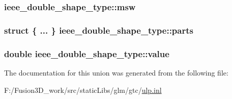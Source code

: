 \subsubsection[{msw}]{ ieee\+\_\+double\+\_\+shape\+\_\+type\+::msw}\label{unionieee__double__shape__type_aea1156759f6afd58a56a7b4e7bfcee01}
\hypertarget{unionieee__double__shape__type_a5f0f0bc8771b433d849b7faf0e48bac6}{}
\subsubsection[{parts}]{\setlength{\rightskip}{0pt plus 5cm}struct \{ ... \}   ieee\+\_\+double\+\_\+shape\+\_\+type\+::parts}\label{unionieee__double__shape__type_a5f0f0bc8771b433d849b7faf0e48bac6}
\hypertarget{unionieee__double__shape__type_a2d9c4cab9e3fa74e4be6d72f798a145b}{}
\subsubsection[{value}]{\setlength{\rightskip}{0pt plus 5cm}double ieee\+\_\+double\+\_\+shape\+\_\+type\+::value}\label{unionieee__double__shape__type_a2d9c4cab9e3fa74e4be6d72f798a145b}


The documentation for this union was generated from the following file\+:\begin{DoxyCompactItemize}
\item 
F\+:/\+Fusion3\+D\+\_\+work/src/static\+Libs/glm/gtc/\hyperlink{ulp_8inl}{ulp.\+inl}\end{DoxyCompactItemize}
